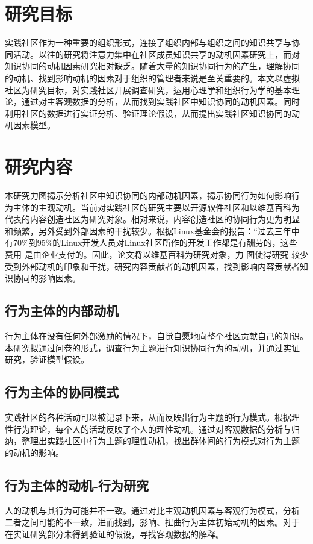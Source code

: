 \documentclass[12pt,a4paper]{ctexart}
\begin{document}
\section{研究目标}
实践社区作为一种重要的组织形式，连接了组织内部与组织之间的知识共享与协
同活动。以往的研究将注意力集中在社区成员知识共享的动机因素研究上，而对
知识协同的动机因素研究相对缺乏。随着大量的知识协同行为的产生，理解协同
的动机、找到影响动机的因素对于组织的管理者来说是至关重要的。本文以虚拟
社区为研究目标，对实践社区开展调查研究，运用心理学和组织行为学的基本理
论，通过对主客观数据的分析，从而找到实践社区中知识协同的动机因素。同时
利用社区的数据进行实证分析、验证理论假设，从而提出实践社区知识协同的动
机因素模型。
\section{研究内容}
本研究力图揭示分析社区中知识协同的内部动机因素，揭示协同行为如何影响行
为主体的主观动机。当前对实践社区的研究主要以开源软件社区和以维基百科为
代表的内容创造社区为研究对象。相对来说，内容创造社区的协同行为更为明显
和频繁，另外受到外部因素的干扰较少。根据Linux基金会的报告：“过去三年中
有70\%到95\%的Linux开发人员对Linux社区所作的开发工作都是有酬劳的，这些
费用 是由企业支付的\cite{linux}。因此，论文将以维基百科为研究对象，力
图使得研究
较少受到外部动机的印象和干扰，研究内容贡献者的动机因素，找到影响内容贡献者知识协同的影响因素。

\subsection{行为主体的内部动机}
行为主体在没有任何外部激励的情况下，自觉自愿地向整个社区贡献自己的知识。
本研究拟通过问卷的形式，调查行为主题进行知识协同行为的动机，并通过实证
研究，验证模型假设。
\subsection{行为主体的协同模式}
实践社区的各种活动可以被记录下来，从而反映出行为主题的行为模式。根据理
性行为理论，每个人的活动反映了个人的理性动机。通过对客观数据的分析与归
纳，整理出实践社区中行为主题的理性动机，找出群体间的行为模式对行为主题
的动机的影响。
\subsection{行为主体的动机-行为研究}
人的动机与其行为可能并不一致。通过对比主观动机因素与客观行为模式，分析
二者之间可能的不一致，进而找到，影响、扭曲行为主体初始动机的因素。对于
在实证研究部分未得到验证的假设，寻找客观数据的解释。
\end{document}
